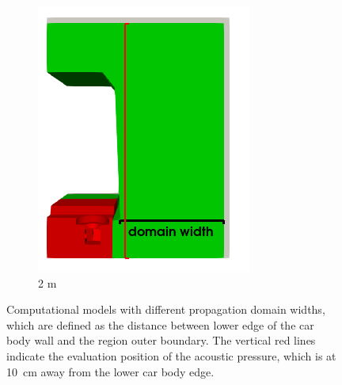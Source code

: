 \begin{figure}
\begin{subfigure}[b]{0.45\textwidth}
		\includegraphics[width=\linewidth]{fig/chap4/simulation_domain/2m.png}
		\caption{2 m}
		\label{fig:domain_width_2m}
	\end{subfigure}
	\caption{Computational models with different propagation domain widths, which are defined as the distance between lower edge of the car body wall and the region outer boundary. The vertical red lines indicate the evaluation position of the acoustic pressure, which is at \SI{10}{\centi\meter} away from the lower car body edge.}
	\label{fig:domain_size_variation}
\end{figure}

